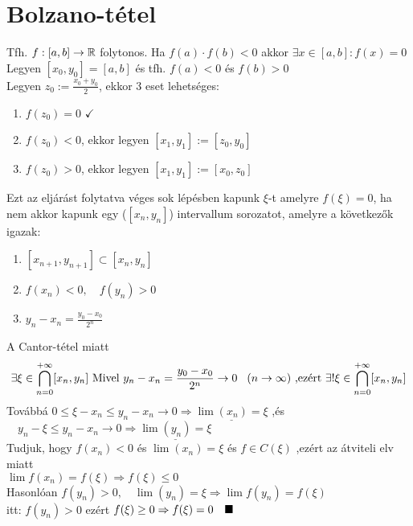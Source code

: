 \documentclass[a4paper,12pt]{article}
\begin{document}
\section{Bolzano-tétel}
	\tetel Tfh. $f: [a,b] \to \mathbb{R}$ folytonos. Ha $f(a)\cdot f(b) < 0$ akkor $\exists x \in [a,b]: f(x) = 0$\\[0.1cm]
	\biz Legyen $ [x_0,y_0] = [a,b] $ és tfh. $f(a) < 0$ és $f(b) > 0 $\\[0.1cm] Legyen $z_0 := \frac{x_0+y_0}{2}$, ekkor 3 eset lehetséges: 
	\begin{enumerate}
		\item $f(z_0) = 0$ $\checkmark$
		\item $f(z_0) < 0$, ekkor legyen $[x_1,y_1] := [z_0,y_0]$
		\item $f(z_0) > 0$, ekkor legyen $[x_1,y_1] := [x_0,z_0]$
	\end{enumerate}
	Ezt az eljárást folytatva véges sok lépésben kapunk $\xi$-t amelyre $f(\xi) = 0$, ha nem akkor kapunk egy ($[x_n,y_n]$) intervallum sorozatot, amelyre a következők igazak:
	\newpage
	\begin{enumerate}
		\item $[x_{n+1},y_{n+1}]\subset[x_n,y_n]$
		\item $f(x_n) < 0,\quad f(y_n) > 0$
		\item $y_n - x_n = \frac{y_0-x_0}{2^n}$
	\end{enumerate}
	A Cantor-tétel miatt \[ \exists\xi\in\bigcap_{n=0}^{+\infty}[x_n,y_n] \text{ Mivel } y_n-x_n = \frac{y_0-x_0}{2^n} \to 0 \hspace*{0.3cm} (n \to \infty) \text{ ,ezért  } \exists ! \xi \in\bigcap_{n=0}^{+\infty}[x_n,y_n] \]
	Továbbá $0 \leq \xi - x_n \leq y_n-x_n \to 0 \Rightarrow \underline{\lim(x_n) = \xi}$ ,és $\quad y_n-\xi \leq y_n-x_n \to 0 \Rightarrow \underline{\lim(y_n) = \xi}$ \\[0.2cm] Tudjuk, hogy $f(x_n) < 0$ és $\lim(x_n) = \xi$ és $f\in C(\xi)$ ,ezért az átviteli elv miatt\\ $\lim f(x_n) = f(\xi) \Rightarrow f(\xi) \leq 0$\\[0.1cm] Hasonlóan $f(y_n) > 0,\quad \lim(y_n) = \xi \Rightarrow \lim f(y_n) = f(\xi)$\\itt: $f(y_n) > 0$ ezért $f(\xi) \geq 0 \Rightarrow f(\xi) = 0\quad\blacksquare$
\end{document}
